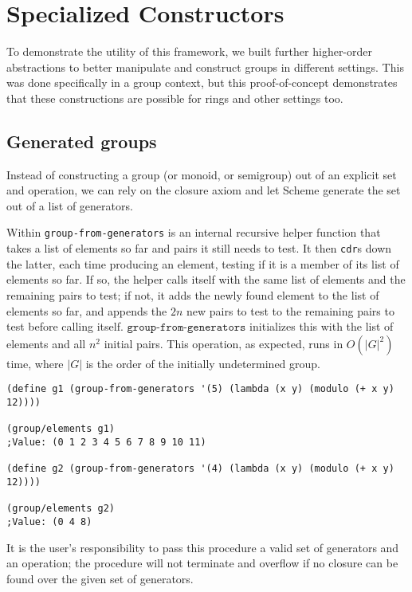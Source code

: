 \documentclass{article}
\begin{document}
    \section{Specialized Constructors}
        
        To demonstrate the utility of this framework, we built further higher-order abstractions to better manipulate and construct groups in different settings. This was done specifically in a group context, but this proof-of-concept demonstrates that these constructions are possible for rings and other settings too.
        
        \subsection{Generated groups}
        \label{generated-groups}
        
        Instead of constructing a group (or monoid, or semigroup) out of an explicit set and operation, we can rely on the closure axiom and let Scheme generate the set out of a list of generators.
        
         Within \texttt{group-from-generators} is an internal recursive helper function that takes a list of elements so far and pairs it still needs to test. It then \texttt{cdr}s down the latter, each time producing an element, testing if it is a member of its list of elements so far. If so, the helper calls itself with the same list of elements and the remaining pairs to test; if not, it adds the newly found element to the list of elements so far, and appends the $2n$ new pairs to test to the remaining pairs to test before calling itself. $\texttt{group-from-generators}$ initializes this with the list of elements and all $n^2$ initial pairs. This operation, as expected, runs in $O(|G|^2)$ time, where $|G|$ is the order of the initially undetermined group. 
         
\begin{verbatim}
(define g1 (group-from-generators '(5) (lambda (x y) (modulo (+ x y) 12))))

(group/elements g1)
;Value: (0 1 2 3 4 5 6 7 8 9 10 11)

(define g2 (group-from-generators '(4) (lambda (x y) (modulo (+ x y) 12))))

(group/elements g2)
;Value: (0 4 8)
\end{verbatim}
         
         It is the user's responsibility to pass this procedure a valid set of generators and an operation; the procedure will not terminate and overflow if no closure can be found over the given set of generators.
        
\end{document}
